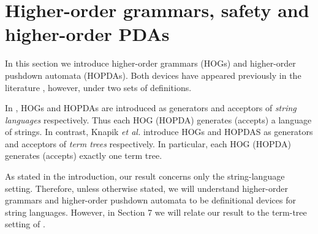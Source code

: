 \section{Higher-order grammars, safety and higher-order PDAs}

In this section we introduce higher-order grammars (HOGs) and
higher-order pushdown automata (HOPDAs). Both devices have
appeared previously in the literature \cite{Dam82, DG86, KNU02,
Eng91}, however, under two sets of definitions.

In \cite{Dam82, DG86, Eng91}, HOGs and HOPDAs are introduced as
generators and acceptors of \emph{string languages} respectively.
Thus each HOG (HOPDA) generates (accepts) a language of strings. In contrast, Knapik \emph{et al.} \cite{KNU01, KNU02} introduce
HOGs and HOPDAS as generators and acceptors of \emph{term trees}
respectively. In particular, each HOG (HOPDA) generates (accepts)
exactly one term tree.

As stated in the introduction, our result concerns only the
string-language setting. Therefore, unless otherwise stated, we
will understand higher-order grammars and higher-order pushdown
automata to be definitional devices for string languages. However,
in Section 7 we will relate our result to the term-tree setting of
\cite{KNU01, KNU02}.


